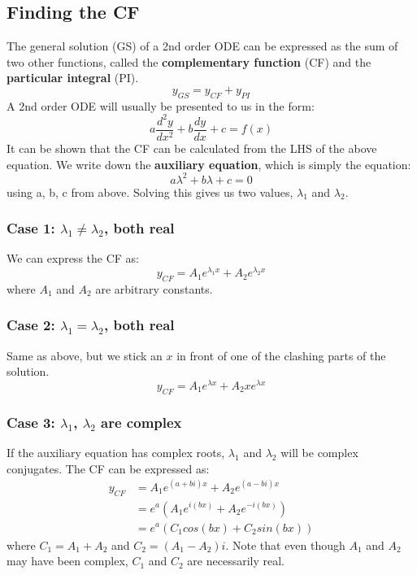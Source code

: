 \documentclass{scrartcl}
\begin{document}
\subsection{Finding the CF}
The general solution (GS) of a 2nd order ODE can be expressed as the sum of two other functions, called the \textbf{complementary function} (CF) and the \textbf{particular integral} (PI).
\begin{equation}
y_{GS} = y_{CF} + y_{PI}
\end{equation} 
A 2nd order ODE will usually be presented to us in the form:
\begin{equation} \label{generalformdifferential}
a\frac{d^{2}y}{dx^{2}} + b\frac{dy}{dx} + c = f(x)
\end{equation}
It can be shown that the CF can be calculated from the LHS of the above equation. We write down the \textbf{auxiliary equation}, which is simply the equation:
\begin{equation}
a\lambda^{2} + b\lambda + c = 0
\end{equation}
using a, b, c from above. Solving this gives us two values, $ \lambda_{1} $ and $ \lambda_{2} $.

\subsubsection*{Case 1: $ \lambda_{1} \neq \lambda_{2} $, both real}
We can express the CF as:
\begin{equation}
y_{CF} = A_{1}e^{\lambda_{1}x} + A_{2}e^{\lambda_{2}x}
\end{equation}
where $ A_{1} $ and $ A_{2} $ are arbitrary constants.

\subsubsection*{Case 2: $ \lambda_{1} = \lambda_{2} $, both real}
Same as above, but we stick an $ x $ in front of one of the clashing parts of the solution.
\begin{equation}
y_{CF} = A_{1}e^{\lambda x} + A_{2}xe^{\lambda x}
\end{equation}

\subsubsection*{Case 3: $ \lambda_{1} $, $ \lambda_{2} $ are complex}
If the auxiliary equation has complex roots, $ \lambda_{1} $ and $ \lambda_{2} $ will be complex conjugates. The CF can be expressed as:
\begin{equation}
\begin{split}
y_{CF} & = A_{1}e^{(a + bi)x} + A_{2}e^{(a - bi)x} \\
       & = e^{a}(A_{1}e^{i(bx)} + A_{2}e^{- i(bx)}) \\
       & = e^{a}(C_{1}cos(bx) + C_{2}sin(bx))
\end{split}
\end{equation}
where $ C_{1} = A_{1} + A_{2} $ and $ C_{2} = (A_{1} - A_{2})i $. Note that even though $ A_{1} $ and $ A_{2} $ may have been complex, $ C_{1} $ and $ C_{2} $ are necessarily real.
\end{document}
